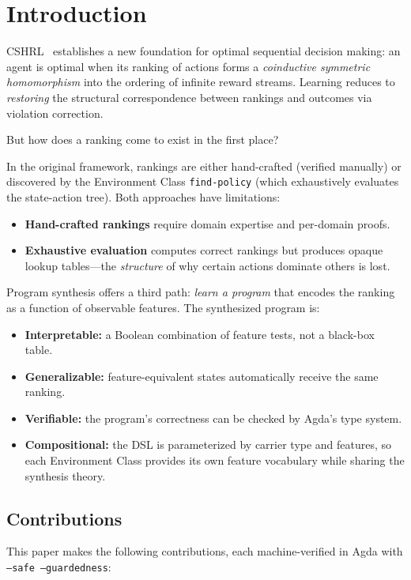 \documentclass[9pt,a4paper]{article}
\theoremstyle{plain}
\theoremstyle{definition}
\theoremstyle{remark}
\begin{document}
\section{Introduction}

CSHRL~\cite{CSHRL2026} establishes a new foundation for optimal sequential decision making: an agent is optimal when its ranking of actions forms a \emph{coinductive symmetric homomorphism} into the ordering of infinite reward streams.  Learning reduces to \emph{restoring} the structural correspondence between rankings and outcomes via violation correction.

But how does a ranking come to exist in the first place?

In the original framework, rankings are either hand-crafted (verified manually) or discovered by the Environment Class \texttt{find-policy} (which exhaustively evaluates the state-action tree).  Both approaches have limitations:
\begin{itemize}
\item \textbf{Hand-crafted rankings} require domain expertise and per-domain proofs.
\item \textbf{Exhaustive evaluation} computes correct rankings but produces opaque lookup tables---the \emph{structure} of why certain actions dominate others is lost.
\end{itemize}

Program synthesis offers a third path: \emph{learn a program} that encodes the ranking as a function of observable features.  The synthesized program is:
\begin{itemize}
\item \textbf{Interpretable:} a Boolean combination of feature tests, not a black-box table.
\item \textbf{Generalizable:} feature-equivalent states automatically receive the same ranking.
\item \textbf{Verifiable:} the program's correctness can be checked by Agda's type system.
\item \textbf{Compositional:} the DSL is parameterized by carrier type and features, so each Environment Class provides its own feature vocabulary while sharing the synthesis theory.
\end{itemize}

\subsection{Contributions}

This paper makes the following contributions, each machine-verified in Agda with \texttt{--safe --guardedness}:
\end{document}
